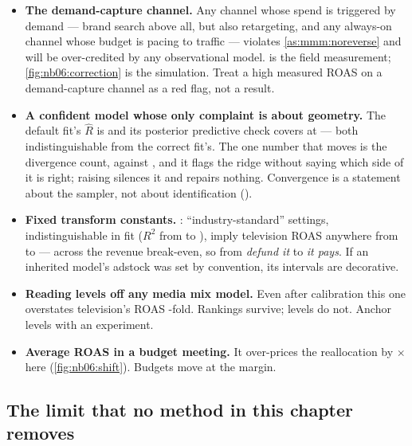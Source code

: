 \begin{itemize}[leftmargin=*, itemsep=.4em]
  \item \textbf{The demand-capture channel.} Any channel whose spend is triggered by demand ---
        brand search above all, but also retargeting, and any always-on channel whose budget is
        pacing to traffic --- violates \cref{as:mmm:noreverse} and will be over-credited by any
        observational model.  is the field measurement; \cref{fig:nb06:correction}
        is the simulation. Treat a high measured ROAS on a demand-capture channel as a red flag,
        not a result.

  \item \textbf{A confident model whose only complaint is about geometry.} The default fit's
        $\hat R$ is \nbSixDefRhat{} and its posterior predictive check covers at
        \pc{\nbSixPpcCovDef} --- both indistinguishable from the correct fit's. The one number that
        moves is the divergence count, \nbSixDefDiv{} against \nbSixCalDiv, and it flags the ridge
        without saying which side of it is right; raising  silences it and
        repairs nothing. Convergence is a statement about the sampler, not about identification
        ().

  \item \textbf{Fixed transform constants.} : \nbSixAssertN{}
        ``industry-standard'' settings, indistinguishable in fit ($R^2$ from \nbSixAssertRsqLo{} to
        \nbSixAssertRsqHi), imply television ROAS anywhere from \nbSixAssertRoasTvLo{} to
        \nbSixAssertRoasTvHi{} --- across the revenue break-even, so from \emph{defund it} to
        \emph{it pays}. If an inherited model's adstock was set by convention, its intervals are
        decorative.

  \item \textbf{Reading levels off any media mix model.} Even after calibration this one
        overstates television's ROAS \nbSixCalRoasTvOverTrue-fold. Rankings survive; levels do
        not. Anchor levels with an experiment.

  \item \textbf{Average ROAS in a budget meeting.} It over-prices the reallocation by
        \nbSixAvgOverSat$\times$ here (\cref{fig:nb06:shift}). Budgets move at the margin.
\end{itemize}

\subsection*{The limit that no method in this chapter removes}


